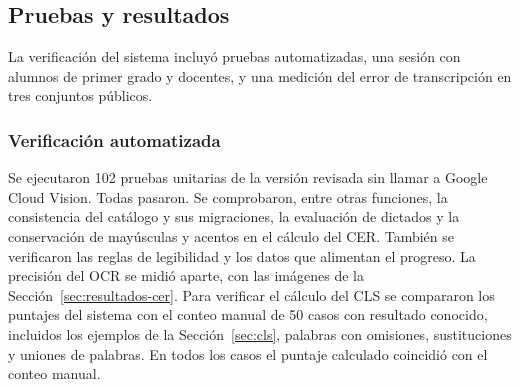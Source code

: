 \subsection{Pruebas y resultados}
\label{sec:pruebas-resultados}

La verificación del sistema incluyó pruebas automatizadas, una sesión con alumnos de primer grado y docentes, y una medición del error de transcripción en tres conjuntos públicos.

\subsubsection{Verificación automatizada}

Se ejecutaron 102 pruebas unitarias de la versión revisada sin llamar a Google Cloud Vision. Todas pasaron. Se comprobaron, entre otras funciones, la consistencia del catálogo y sus migraciones, la evaluación de dictados y la conservación de mayúsculas y acentos en el cálculo del CER. También se verificaron las reglas de legibilidad y los datos que alimentan el progreso. La precisión del OCR se midió aparte, con las imágenes de la Sección~\ref{sec:resultados-cer}. Para verificar el cálculo del CLS se compararon los puntajes del sistema con el conteo
manual de 50 casos con resultado conocido, incluidos los ejemplos de la Sección~\ref{sec:cls}, palabras con omisiones, sustituciones y uniones de palabras.
En todos los casos el puntaje calculado coincidió con el conteo manual.






